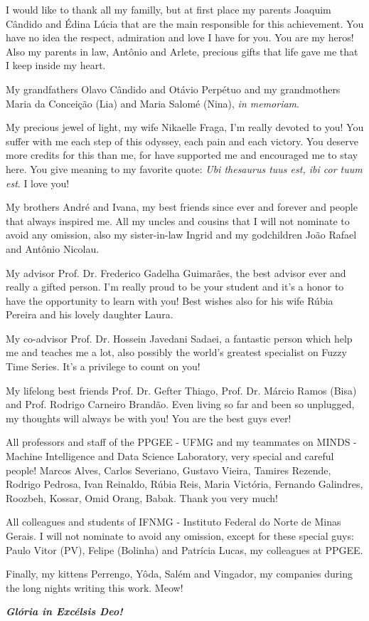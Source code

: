 \begin{agradecimentos}
I would like to thank all my familly, but at first place my parents Joaquim Cândido and Édina Lúcia that are the main responsible for this achievement.  You have no idea the respect, admiration and love I have for you. You are my heros! Also my parents in law, Antônio and Arlete, precious gifts that life gave me that I keep inside my heart. 

My grandfathers Olavo Cândido and Otávio Perpétuo and my grandmothers Maria da Conceição (Lia) and Maria Salomé (Nina), \textit{in memoriam}.

My precious jewel of light, my wife Nikaelle Fraga, I'm really devoted to you! You suffer with me each step of this odyssey, each pain and each victory. You deserve more credits for this than me, for have supported me and encouraged me to stay here. You give meaning to my favorite quote: \textit{Ubi thesaurus tuus est, ibi cor tuum est}. I love you!

My brothers André and Ivana, my best friends since ever and forever and people that always inspired me. All my uncles and cousins that I will not nominate to avoid any omission, also my sister-in-law Ingrid and my godchildren João Rafael and Antônio Nicolau. 

My advisor Prof. Dr. Frederico Gadelha Guimarães, the best advisor ever and really a gifted person. I'm really proud to be your student and it's a honor to have the opportunity to learn with you! Best wishes also for his wife Rúbia Pereira and his lovely daughter Laura.

My co-advisor Prof. Dr. Hossein Javedani Sadaei, a fantastic person which help me and teaches me a lot, also possibly the world's greatest specialist on Fuzzy Time Series. It's a privilege to count on you!

My lifelong best friends Prof. Dr. Gefter Thiago, Prof. Dr. Márcio Ramos (Bisa) and Prof. Rodrigo Carneiro Brandão. Even living so far and been so unplugged, my thoughts will always be with you! You are the best guys ever! 

All professors and staff of the PPGEE - UFMG and my teammates on MINDS - Machine Intelligence and Data Science Laboratory, very special and careful people! Marcos Alves, Carlos Severiano, Gustavo Vieira, Tamires Rezende, Rodrigo Pedrosa, Ivan Reinaldo, Rúbia Reis, Maria Victória, Fernando Galindres, Roozbeh, Kossar, Omid Orang, Babak. Thank you very much!  

All colleagues and students of IFNMG - Instituto Federal do Norte de Minas Gerais. I will not nominate to avoid any  omission, except for these special guys: Paulo Vitor (PV),  Felipe (Bolinha) and Patrícia Lucas, my colleagues at PPGEE.

Finally, my kittens Perrengo, Yôda, Salém and Vingador, my companies during the long nights writing this work. Meow!

\vspace{5cm}


\begin{center}
\textbf{\textit{Glória in Excélsis Deo!}}
\end{center}

\end{agradecimentos}
